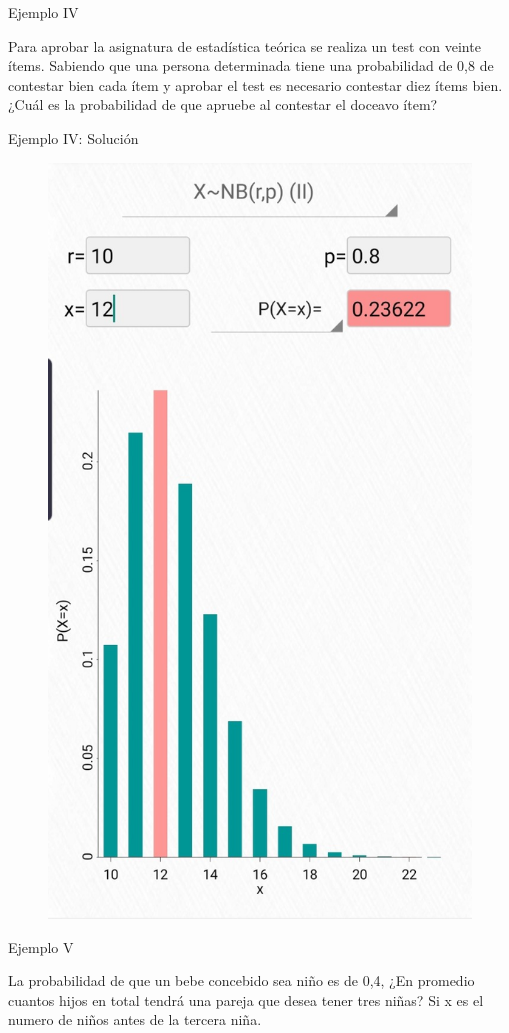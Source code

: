 \documentclass{beamer}
\begin{document}
	\begin{frame}{Ejemplo IV}
	    \begin{examples}
    	    Para aprobar la asignatura de estadística teórica se realiza un test con veinte ítems. Sabiendo que una persona determinada tiene una probabilidad de 0,8 de contestar bien cada ítem y aprobar el test es necesario contestar diez ítems bien. ¿Cuál es la probabilidad de que apruebe al contestar el doceavo ítem?
	    \end{examples}
	\end{frame}
	\begin{frame}{Ejemplo IV: Solución}
	    \begin{figure}
    		\includegraphics[width=0.4\linewidth]{IV.jpg}
		\end{figure}
	\end{frame}
	\begin{frame}{Ejemplo V}
	    \begin{examples}
    	    La probabilidad de que un bebe concebido sea niño es de 0,4, ¿En promedio cuantos hijos en total tendrá una pareja que desea tener tres niñas? Si x es el numero de niños antes de la tercera niña.
	    \end{examples}
	\end{frame}
\end{document}
